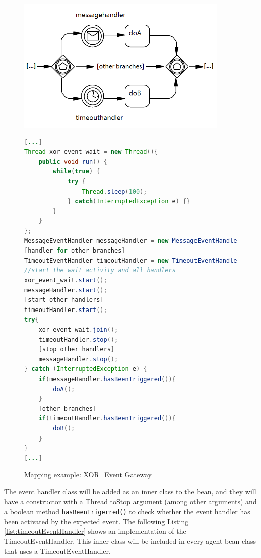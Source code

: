 \begin{figure}[h]
\begin{minipage}[c]{0.5\textwidth}
\includegraphics[width=0.9\textwidth]{images/mapping/xor-event.png}
\end{minipage}
\begin{minipage}[c]{0.5\textwidth}
\begin{lstlisting}[language=Java]
[...]
Thread xor_event_wait = new Thread(){
	public void run() {
		while(true) {
			try {
				Thread.sleep(100);
			} catch(InterruptedException e) {}
		}
	}
};
MessageEventHandler messageHandler = new MessageEventHandler(xor_event_wait);
[handler for other branches]
TimeoutEventHandler timeoutHandler = new TimeoutEventHandler(20000, xor_event_wait);
//start the wait activity and all handlers
xor_event_wait.start();
messageHandler.start();
[start other handlers]
timeoutHandler.start();
try{
	xor_event_wait.join();
	timeoutHandler.stop();
	[stop other handlers]
	messageHandler.stop();
} catch (InterruptedException e) {
	if(messageHandler.hasBeenTriggered()){
		doA();
	}
	[other branches]
	if(timeoutHandler.hasBeenTriggered()){
		doB();
	}
}
[...]
\end{lstlisting}
\end{minipage}
\caption{Mapping example: XOR\_Event Gateway}%
\label{fig:mapping_xorEvent}%
\end{figure}
\newpage
The event handler class will be added as an inner class to the bean, and they will have a constructor with a Thread toStop argument (among other arguments) and a boolean method \verb|hasBeenTrigerred()| to check whether the event handler has been activated by the expected event. The following Listing \ref{list:timeoutEventHandler} shows an implementation of the TimeoutEventHandler. This inner class will be included in every agent bean class that uses a TimeoutEventHandler.\\\\

